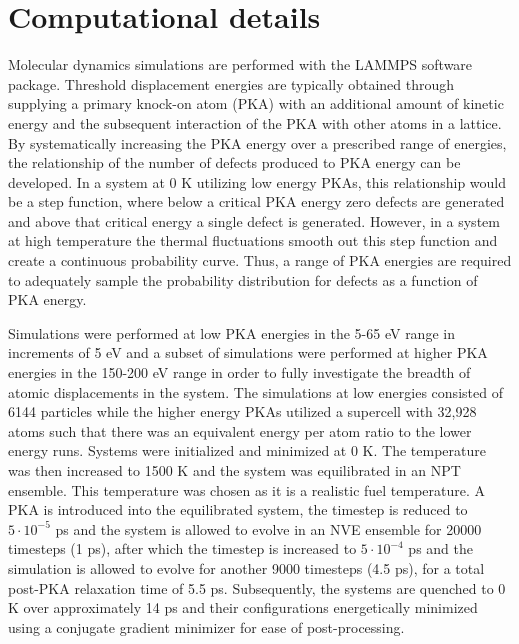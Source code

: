 \documentclass[8pt]{article}   	%
\begin{document}
\section{Computational details}

\hspace{5mm}

Molecular dynamics simulations are performed with the LAMMPS \cite{lammps} software package. Threshold displacement energies are typically obtained through supplying a primary knock-on atom (PKA) with an additional amount of kinetic energy and the subsequent interaction of the PKA with other atoms in a lattice. By systematically increasing the PKA energy over a prescribed range of energies, the relationship of the number of defects produced to PKA energy can be developed. In a system at 0 K utilizing low energy PKAs, this relationship would be a step function, where below a critical PKA energy zero defects are generated and above that critical energy a single defect is generated. However, in a system at high temperature the thermal fluctuations smooth out this step function and create a continuous probability curve. Thus, a range of PKA energies are required to adequately sample the probability distribution for defects as a function of PKA energy.

Simulations were performed at low PKA energies in the 5-65 eV range in increments of 5 eV and a subset of simulations were performed at higher PKA energies in the 150-200 eV range in order to fully investigate the breadth of atomic displacements in the system. The simulations at low energies consisted of 6144 particles while the higher energy PKAs utilized a supercell with 32,928 atoms such that there was an equivalent energy per atom ratio to the lower energy runs. Systems were initialized and minimized at 0 K. The temperature was then increased to 1500 K and the system was equilibrated in an NPT ensemble. This temperature was chosen as it is a realistic fuel temperature. A PKA is introduced into the equilibrated system, the timestep is reduced to $5\cdot10^{-5}$ ps and the system is allowed to evolve in an NVE ensemble for 20000 timesteps (1 ps), after which the timestep is increased to $5\cdot10^{-4}$ ps and the simulation is allowed to evolve for another 9000 timesteps (4.5 ps), for a total post-PKA relaxation time of 5.5 ps.  Subsequently, the systems are quenched to 0 K over approximately 14 ps and their configurations energetically minimized using a conjugate gradient minimizer for ease of post-processing.
\end{document}
